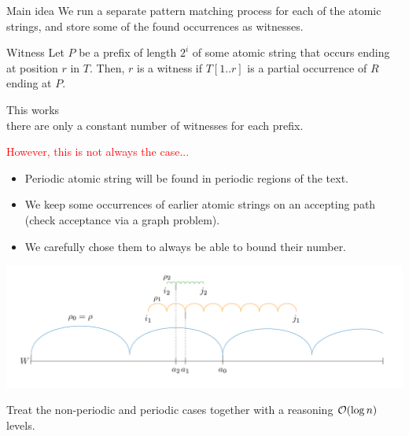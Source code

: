 \begin{frame}

\begin{exampleblock}{Main idea}
We run a separate pattern matching process for each of the atomic strings, and store some of the found occurrences as witnesses.
\end{exampleblock}

\pause
\begin{block}{Witness}
Let $P$ be a prefix of length $2^{i}$ of some atomic string that occurs ending at position $r$ in $T$. Then, $r$ is a witness
if $T[1..r]$ is a partial occurrence of $R$ ending at $P$.
\end{block}
\pause

This works \pause \\
there are only a constant number of witnesses for each prefix.\\
\pause

\vfill
\textcolor{red}{However, this is not always the case...}

\end{frame}
    
    
    


\begin{frame} 
\begin{itemize}
\pause
\item Periodic atomic string will be found in periodic regions of the text.
\pause
\item We keep some occurrences of earlier atomic strings on an accepting path (check acceptance via a graph problem).
\pause 
\item We carefully chose them to always be able to bound their number.
\end{itemize}
\pause

\begin{center}
\includegraphics[width=\textwidth]{pictures/anchors.png}
\end{center}
\pause

 Treat the non-periodic and periodic cases together with a reasoning $\mathcal{O}(\log n)$ levels.

\end{frame}

